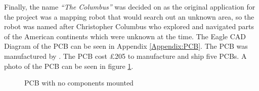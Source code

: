 Finally, the name \textit{``The Columbus''} was decided on as the original application for the project was a mapping robot that would search out an unknown area, so the robot was named after Christopher Columbus who explored and navigated parts of the American continents which were unknown at the time. The Eagle CAD Diagram of the PCB can be seen in Appendix \ref{Appendix:PCB}. The PCB was manufactured by \cite{PCBCart}. The PCB cost \pounds 205 to manufacture and ship five PCBs. A photo of the PCB can be seen in figure \ref{fig:PCB:Bare}. 

\begin{figure}
\centering
{}
\caption{PCB with no components mounted}
\label{fig:PCB:Bare}
\end{figure}

